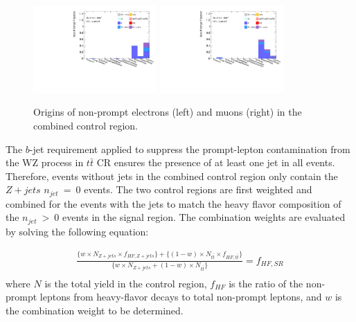 \begin{figure}[!htb]
        \centering
        \includegraphics[width = 0.42\textwidth]{figures/Analysis/Background/NonPromptComposition_Combined_Electrons.pdf}
        \includegraphics[width = 0.42\textwidth]{figures/Analysis/Background/NonPromptComposition_Combined_Muons.pdf}
        \caption{ Origins of non-prompt electrons (left) and muons (right) in the combined control region. \label{fig:NonPromptCombined}}
\end{figure}

The $b$-jet requirement applied to suppress the prompt-lepton contamination from the WZ process in $t\bar{t}$ CR ensures the presence of at least one jet in all events. Therefore, events without jets in the combined control region only contain the $Z+jets$ $n_{jet}~=~0$ events. The two control regions are first weighted and combined for the events with the jets to match the heavy flavor composition of the $n_{jet}~>~0$ events in the signal region. The combination weights are evaluated by solving the following equation$:$

\begin{equation}
\begin{aligned}
\frac{\{w \times N_{Z+jets} \times f_{HF, Z+jets}\} + \{ (1-w) \times N_{t\bar{t}} \times f_{HF, t\bar{t}}\}}{\{w \times N_{Z+jets} + (1-w) \times N_{t\bar{t}} \}} = f_{HF, SR}  \\
\end{aligned}
\end{equation}
where $N$ is the total yield in the control region, $ f_{HF}$ is the ratio of the non-prompt leptons from heavy-flavor decays to total non-prompt leptons, and $w$ is the combination weight to be determined.

